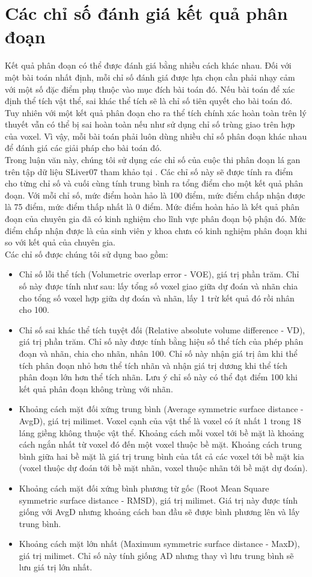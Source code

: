 \section{Các chỉ số đánh giá kết quả phân đoạn}
Kết quả phân đoạn có thể được đánh giá bằng nhiều cách khác nhau. Đối với một bài toán nhất định, mỗi chỉ số đánh giá được lựa chọn cần phải nhạy cảm với một số đặc điểm phụ thuộc vào mục đích bài toán đó. Nếu bài toán để xác định thể tích vật thể, sai khác thể tích sẽ là chỉ số tiên quyết cho bài toán đó. Tuy nhiên với một kết quả phân đoạn cho ra thể tích chính xác hoàn toàn trên lý thuyết vẫn có thể bị sai hoàn toàn nếu như sử dụng chỉ số trùng giao trên hợp của voxel. Vì vậy, mỗi bài toán phải luôn dùng nhiều chỉ số phân đoạn khác nhau để đánh giá các giải pháp cho bài toán đó.\\
Trong luận văn này, chúng tôi sử dụng các chỉ số của cuộc thi phân đoạn lá gan trên tập dữ liệu SLiver07 tham khảo tại \cite{SLiver07metric}. Các chỉ số này sẽ được tính ra điểm cho từng chỉ số và cuối cùng tính trung bình ra tổng điểm cho một kết quả phân đoạn. Với mỗi chỉ số, mức điểm hoàn hảo là 100 điểm, mức điểm chấp nhận được là 75 điểm, mức điểm thấp nhất là 0 điểm. Mức điểm hoàn hảo là kết quả phân đoạn của chuyên gia đã có kinh nghiệm cho lĩnh vực phân đoạn bộ phận đó. Mức điểm chấp nhận được là của sinh viên y khoa chưa có kinh nghiệm phân đoạn khi so với kết quả của chuyên gia.\\
Các chỉ số được chúng tôi sử dụng bao gồm:
\begin{itemize}
    \item Chỉ số lỗi thể tích (Volumetric overlap error - VOE), giá trị phần trăm. Chỉ số này được tính như sau: lấy tổng số voxel giao giữa dự đoán và nhãn chia cho tổng số voxel hợp giữa dự đoán và nhãn, lấy 1 trừ kết quả đó rồi nhân cho 100.
    \item Chỉ số sai khác thể tích tuyệt đối (Relative absolute volume difference - VD), giá trị phần trăm. Chỉ số này được tính bằng hiệu số thể tích của phép phân đoạn và nhãn, chia cho nhãn, nhân 100. Chỉ số này nhận giá trị âm khi thể tích phân đoạn nhỏ hơn thể tích nhãn và nhận giá trị dương khi thể tích phân đoạn lớn hơn thể tích nhãn. Lưu ý chỉ số này có thể đạt điểm 100 khi kết quả phân đoạn không trùng với nhãn.
    \item Khoảng cách mặt đối xứng trung bình (Average symmetric surface distance - AvgD), giá trị milimet. Voxel cạnh của vật thể là voxel có ít nhất 1 trong 18 láng giềng không thuộc vật thể. Khoảng cách mỗi voxel tới bề mặt là khoảng cách ngắn nhất từ voxel đó đến một voxel thuộc bề mặt. Khoảng cách trung bình giữa hai bề mặt là giá trị trung bình của tất cả các voxel tới bề mặt kia (voxel thuộc dự đoán tới bề mặt nhãn, voxel thuộc nhãn tới bề mặt dự đoán).
    \item Khoảng cách mặt đối xứng bình phương từ gốc (Root Mean Square symmetric surface distance - RMSD), giá trị milimet. Giá trị này được tính giống với  AvgD nhưng khoảng cách ban đầu sẽ được bình phương lên và lấy trung bình.
    \item Khoảng cách mặt lớn nhất (Maximum symmetric surface distance - MaxD), giá trị milimet. Chỉ số này tính giống AD nhưng thay vì lưu trung bình sẽ lưu giá trị lớn nhất.
\end{itemize}
